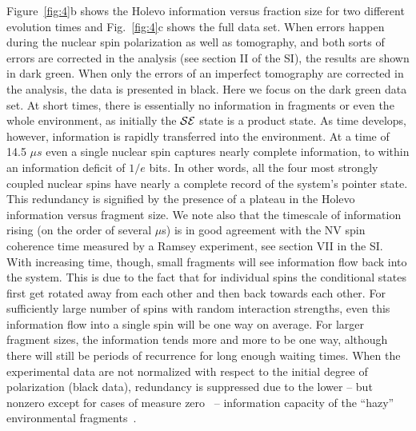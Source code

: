 \documentclass[aps,prl,floatfix,twocolumn,footinbib,superscriptaddress]{revtex4-1}
\begin{document}
Figure~\ref{fig:4}b shows the Holevo information versus fraction size for two different evolution times and Fig.~\ref{fig:4}c shows the full data set. When errors happen during the nuclear spin polarization as well as tomography, and both sorts of errors are corrected in the analysis (see section \RN{2} of the SI), the results are shown in dark green. When only the errors of an imperfect tomography are corrected in the analysis, the data is presented in black. Here we focus on the dark green data set. At short times, there is essentially no information in fragments or even the whole environment, as initially the $\mathcal{S}\mathcal{E}$ state is a product state. As time develops, however, information is rapidly transferred into the environment. At a time of 14.5 $\mu s$ even a single nuclear spin captures nearly complete information, to within an information deficit of $1/e$ bits. In other words, all the four most strongly coupled nuclear spins have nearly a complete record of the system's pointer state. This redundancy is signified by the presence of a plateau in the Holevo information versus fragment size. We note also that the timescale of information rising (on the order of several $\mu$s) is in good agreement with the NV spin coherence time measured by a Ramsey experiment, see section \RN{7} in the SI. With increasing time, though, small fragments will see information flow back into the system. This is due to the fact that for individual spins the conditional states first get rotated away from each other and then back towards each other. For sufficiently large number of spins with random interaction strengths, even this information flow into a single spin will be one way on average. For larger fragment sizes, the information tends more and more to be one way, although there will still be periods of recurrence for long enough waiting times. When the experimental data are not normalized with respect to the initial degree of polarization (black data), redundancy is suppressed due to the lower -- but nonzero except for cases of measure zero~\cite{Zwolak14,zwolak16} -- information capacity of the ``hazy'' environmental fragments~\cite{Zwolak09,Zwolak10-1}. 
\end{document}
